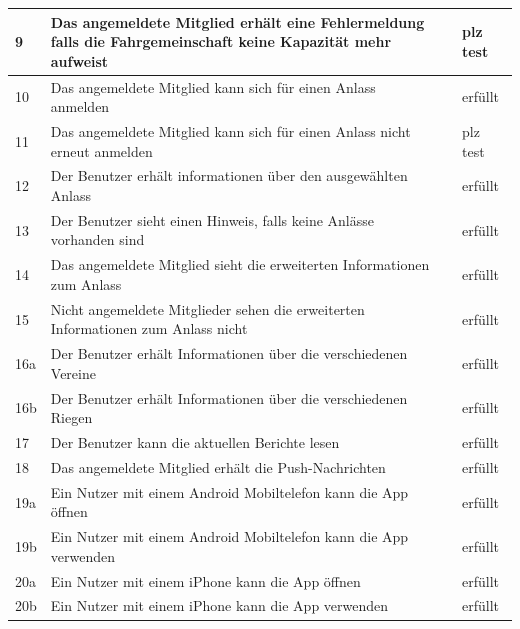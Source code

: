 \begin{longtable}{ l | p{7cm} | l | l }
	9	&	Das angemeldete Mitglied erhält eine Fehlermeldung falls die Fahrgemeinschaft keine Kapazität mehr aufweist
				&	\nameref{table:req_4} 	&	plz test\\ \hline
	10	&	Das angemeldete Mitglied kann sich für einen Anlass anmelden
				&	\nameref{table:req_5} 	&	erfüllt\\ \hline
	11	&	Das angemeldete Mitglied kann sich für einen Anlass nicht erneut anmelden
				&	\nameref{table:req_5} 	&	plz test\\ \hline
	12	&	Der Benutzer erhält informationen über den ausgewählten Anlass
				&	\nameref{table:req_6} 	&	erfüllt\\ \hline
	13	&	Der Benutzer sieht einen Hinweis, falls keine Anlässe vorhanden sind
				&	\nameref{table:req_6} 	&	erfüllt\\ \hline
	14	&	Das angemeldete Mitglied sieht die erweiterten Informationen zum Anlass
				&	\nameref{table:req_7} 	&	erfüllt\\ \hline
	15	&	Nicht angemeldete Mitglieder sehen die erweiterten Informationen zum Anlass nicht
				&	\nameref{table:req_7} 	&	erfüllt\\ \hline
	16a	&	Der Benutzer erhält Informationen über die verschiedenen Vereine
				&	\nameref{table:req_8} 	&	erfüllt\\ \hline
	16b	&	Der Benutzer erhält Informationen über die verschiedenen Riegen
				&	\nameref{table:req_8} 	&	erfüllt\\ \hline
	17	&	Der Benutzer kann die aktuellen Berichte lesen
				&	\nameref{table:req_9} 	&	erfüllt\\ \hline
	18	&	Das angemeldete Mitglied erhält die Push-Nachrichten
				&	\nameref{table:req_10} 	&	erfüllt\\ \hline
	19a	&	Ein Nutzer mit einem Android Mobiltelefon kann die App öffnen
				&	\nameref{table:req_nf_1} 	&	erfüllt\\ \hline
	19b	&	Ein Nutzer mit einem Android Mobiltelefon kann die App verwenden
				&	\nameref{table:req_nf_1} 	&	erfüllt\\ \hline
	20a	&	Ein Nutzer mit einem iPhone kann die App öffnen
				&	\nameref{table:req_nf_2} 	&	erfüllt\\ \hline
	20b	&	Ein Nutzer mit einem iPhone kann die App verwenden
				&	\nameref{table:req_nf_2} 	&	erfüllt

\end{longtable}

\newpage
